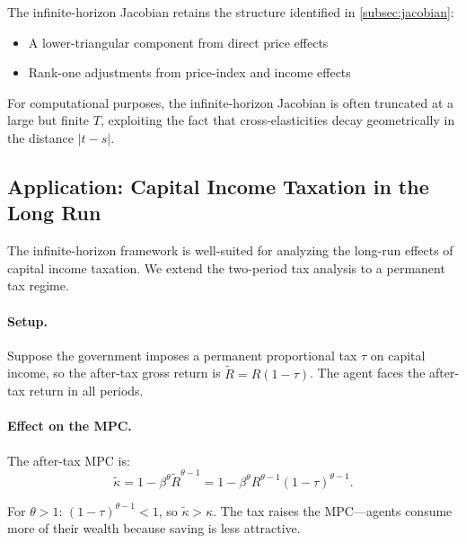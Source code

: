 \begin{calloutnote}
The infinite-horizon Jacobian retains the structure identified in \cref{subsec:jacobian}:
\begin{itemize}[nosep]
\item A lower-triangular component from direct price effects
\item Rank-one adjustments from price-index and income effects
\end{itemize}

For computational purposes, the infinite-horizon Jacobian is often truncated at a large but finite $T$, exploiting the fact that cross-elasticities decay geometrically in the distance $|t - s|$.
\end{calloutnote}

\subsection{Application: Capital Income Taxation in the Long Run}
\label{subsec:infinite-tax}

The infinite-horizon framework is well-suited for analyzing the long-run effects of capital income taxation. We extend the two-period tax analysis to a permanent tax regime.

\paragraph{Setup.}
Suppose the government imposes a permanent proportional tax $\tau$ on capital income, so the after-tax gross return is $\tilde{R} = R(1 - \tau)$. The agent faces the after-tax return in all periods.

\paragraph{Effect on the MPC.}
The after-tax MPC is:
\begin{equation}
\tilde{\kappa} = 1 - \beta^\theta \tilde{R}^{\theta - 1} = 1 - \beta^\theta R^{\theta - 1} (1 - \tau)^{\theta - 1}.
\label{eq:mpc-tax}
\end{equation}

For $\theta > 1$: $(1 - \tau)^{\theta - 1} < 1$, so $\tilde{\kappa} > \kappa$. The tax raises the MPC---agents consume more of their wealth because saving is less attractive.

